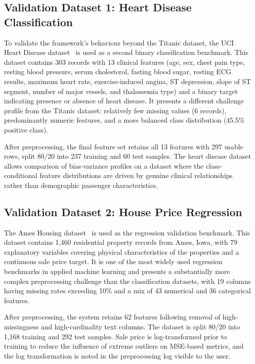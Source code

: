 \documentclass[conference]{IEEEtran}
\begin{document}
\subsection{Validation Dataset 1: Heart Disease Classification}

To validate the framework's behaviour beyond the Titanic dataset, the UCI Heart Disease dataset~\cite{b33} is used as a second binary classification benchmark. This dataset contains 303 records with 13 clinical features (age, sex, chest pain type, resting blood pressure, serum cholesterol, fasting blood sugar, resting ECG results, maximum heart rate, exercise-induced angina, ST depression, slope of ST segment, number of major vessels, and thalassemia type) and a binary target indicating presence or absence of heart disease. It presents a different challenge profile from the Titanic dataset: relatively few missing values (6 records), predominantly numeric features, and a more balanced class distribution (45.5\% positive class).

After preprocessing, the final feature set retains all 13 features with 297 usable rows, split 80/20 into 237 training and 60 test samples. The heart disease dataset allows comparison of bias-variance profiles on a dataset where the class-conditional feature distributions are driven by genuine clinical relationships rather than demographic passenger characteristics.

\subsection{Validation Dataset 2: House Price Regression}

The Ames Housing dataset~\cite{b34} is used as the regression validation benchmark. This dataset contains 1,460 residential property records from Ames, Iowa, with 79 explanatory variables covering physical characteristics of the properties and a continuous sale price target. It is one of the most widely used regression benchmarks in applied machine learning and presents a substantially more complex preprocessing challenge than the classification datasets, with 19 columns having missing rates exceeding 10\% and a mix of 43 numerical and 36 categorical features.

After preprocessing, the system retains 62 features following removal of high-missingness and high-cardinality text columns. The dataset is split 80/20 into 1,168 training and 292 test samples. Sale price is log-transformed prior to training to reduce the influence of extreme outliers on MSE-based metrics, and the log transformation is noted in the preprocessing log visible to the user.
\end{document}
